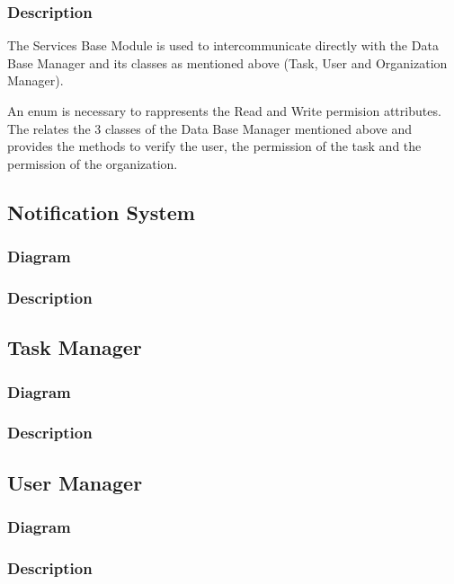 \documentclass{article}
\begin{document}
\begin{itemsize}
\subsubsection{Description}

The Services Base Module is used to intercommunicate directly with the Data Base Manager and its classes as mentioned above (Task, User and Organization Manager).

An enum is necessary to rappresents the Read and Write permision attributes. The relates the 3 classes of the Data Base Manager mentioned above and provides the methods to verify the user, the permission of the task and the permission of the organization.

\subsection{Notification System}

\subsubsection{Diagram}

\subsubsection{Description}

\subsection{Task Manager} %

\subsubsection{Diagram}

\subsubsection{Description}

\subsection{User Manager} %

\subsubsection{Diagram}

\subsubsection{Description}


\end{itemsize}
\end{document}

